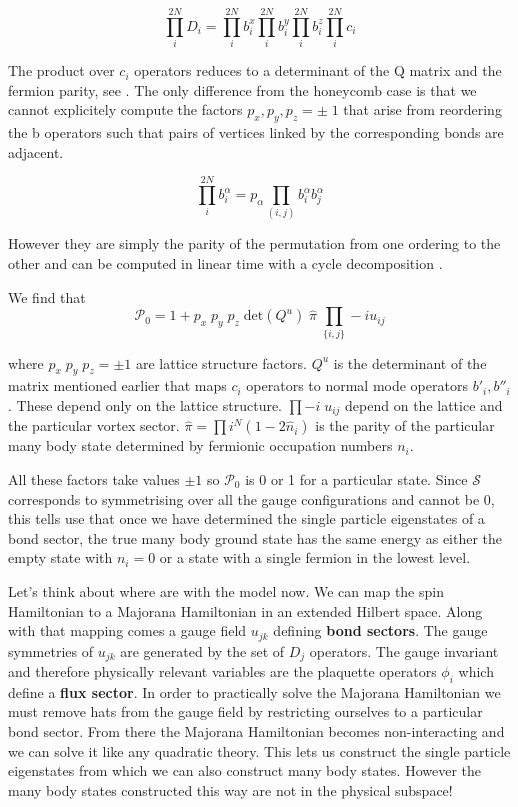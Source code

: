 \[\prod_i^{2N} D_i = \prod_i^{2N} b^x_i \prod_i^{2N} b^y_i \prod_i^{2N} b^z_i \prod_i^{2N} c_i\]

The product over \(c_i\) operators reduces to a determinant of the Q
matrix and the fermion parity, see
\textcite{pedrocchiPhysicalSolutionsKitaev2011b} . The only difference
from the honeycomb case is that we cannot explicitely compute the
factors \(p_x,p_y,p_z = \pm\;1\) that arise from reordering the b
operators such that pairs of vertices linked by the corresponding bonds
are adjacent.

\[\prod_i^{2N} b^\alpha_i = p_\alpha \prod_{(i,j)}b^\alpha_i b^\alpha_j\]

However they are simply the parity of the permutation from one ordering
to the other and can be computed in linear time with a cycle
decomposition \textcite{app:cycle_decomp}.

We find that
\[\mathcal{P}_0 = 1 + p_x\;p_y\;p_z\; \mathrm{det}(Q^u) \; \hat{\pi} \; \prod_{\{i,j\}} -iu_{ij}\]

where \(p_x\;p_y\;p_z = \pm 1\) are lattice structure factors. \(Q^u\)
is the determinant of the matrix mentioned earlier that maps \(c_i\)
operators to normal mode operators \(b'_i, b''_i\). These depend only on
the lattice structure. \(\prod -i \; u_{ij}\) depend on the lattice and
the particular vortex sector.
\(\hat{\pi} = \prod{i}^{N} (1 - 2\hat{n}_i)\) is the parity of the
particular many body state determined by fermionic occupation numbers
\(n_i\).

All these factors take values \(\pm 1\) so \(\mathcal{P}_0\) is 0 or 1
for a particular state. Since \(\mathcal{S}\) corresponds to
symmetrising over all the gauge configurations and cannot be 0, this
tells use that once we have determined the single particle eigenstates
of a bond sector, the true many body ground state has the same energy as
either the empty state with \(n_i = 0\) or a state with a single fermion
in the lowest level.

Let's think about where are with the model now. We can map the spin
Hamiltonian to a Majorana Hamiltonian in an extended Hilbert space.
Along with that mapping comes a gauge field \(u_{jk}\) defining
\textbf{bond sectors}. The gauge symmetries of \(u_{jk}\) are generated
by the set of \(D_j\) operators. The gauge invariant and therefore
physically relevant variables are the plaquette operators \(\phi_i\)
which define a \textbf{flux sector}. In order to practically solve the
Majorana Hamiltonian we must remove hats from the gauge field by
restricting ourselves to a particular bond sector. From there the
Majorana Hamiltonian becomes non-interacting and we can solve it like
any quadratic theory. This lets us construct the single particle
eigenstates from which we can also construct many body states. However
the many body states constructed this way are not in the physical
subspace!

